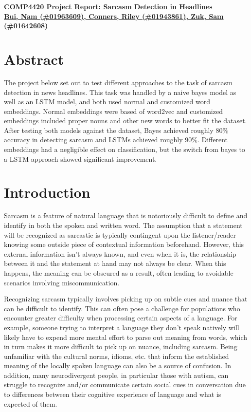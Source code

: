 \documentclass[11pt]{article}
\def\proptitle{COMP4420 Project Report: Sarcasm Detection in Headlines}
\def\propauthors{Bui, Nam (\#01963609), 
                 Conners, Riley (\#01943861), 
                 Zuk, Sam (\#01642608)}
\begin{document}
\begin{center}
    \textbf{\Large{\proptitle}} \\
    \textbf{\underline{\propauthors}}
\end{center}

\bigskip

\section{Abstract}

The project below set out to test different approaches to the task of sarcasm detection in news headlines. This task was handled by a naive bayes model as well as an LSTM model, and both used normal and customized word embeddings. Normal embeddings were based of word2vec and customized embeddings included proper nouns and other new words to better fit the dataset. After testing both models against the dataset, Bayes achieved roughly 80\% accuracy in detecting sarcasm and LSTMs achieved roughly 90\%. Different embeddings had a negligible effect on classification, but the switch from bayes to a LSTM approach showed significant improvement. 



\section{Introduction}

Sarcasm is a feature of natural language that is notoriously difficult to
define and identify in both the spoken and written word. The assumption that a
statement will be recognized as sarcastic is typically contingent upon the
listener/reader knowing some outside piece of contextual information
beforehand. However, this external information isn't always known, and even
when it is, the relationship between it and the statement at hand may not
always be clear. When this happens, the meaning can be obscured as a result,
often leading to avoidable scenarios involving miscommunication.

Recognizing sarcasm typically involves picking up on subtle cues and nuance
that can be difficult to identify. This can often pose a challenge for
populations who encounter greater difficulty when processing certain aspects of
a language. For example, someone trying to interpret a language they don't
speak natively will likely have to expend more mental effort to parse out
meaning from words, which in turn makes it more difficult to pick up on nuance,
including sarcasm. Being unfamiliar with the cultural norms, idioms, etc. that
inform the established meaning of the locally spoken language can also be a
source of confusion. In addition, many neurodivergent people, in particular
those with autism, can struggle to recognize and/or communicate certain social
cues in conversation due to differences between their cognitive experience of
language and what is expected of them.
\end{document}
